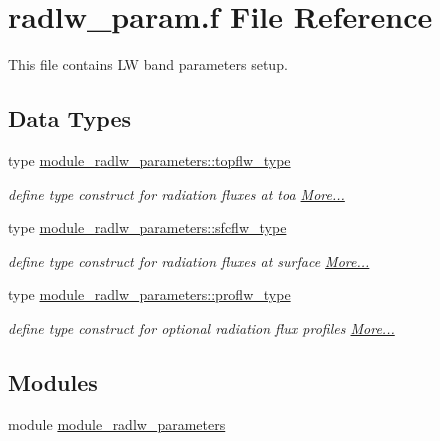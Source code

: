 \hypertarget{radlw__param_8f}{}\section{radlw\+\_\+param.\+f File Reference}
\label{radlw__param_8f}


This file contains LW band parameters setup.  


\subsection*{Data Types}
\begin{DoxyCompactItemize}
\item 
type \hyperlink{namespacemodule__radlw__parameters_structmodule__radlw__parameters_1_1topflw__type}{module\+\_\+radlw\+\_\+parameters\+::topflw\+\_\+type}
\begin{DoxyCompactList}\small\item\em define type construct for radiation fluxes at toa  \hyperlink{namespacemodule__radlw__parameters_structmodule__radlw__parameters_1_1topflw__type}{More...}\end{DoxyCompactList}\item 
type \hyperlink{group__module__radlw__main_structmodule__radlw__parameters_1_1sfcflw__type}{module\+\_\+radlw\+\_\+parameters\+::sfcflw\+\_\+type}
\begin{DoxyCompactList}\small\item\em define type construct for radiation fluxes at surface  \hyperlink{group__module__radlw__main_structmodule__radlw__parameters_1_1sfcflw__type}{More...}\end{DoxyCompactList}\item 
type \hyperlink{group__module__radlw__main_structmodule__radlw__parameters_1_1proflw__type}{module\+\_\+radlw\+\_\+parameters\+::proflw\+\_\+type}
\begin{DoxyCompactList}\small\item\em define type construct for optional radiation flux profiles  \hyperlink{group__module__radlw__main_structmodule__radlw__parameters_1_1proflw__type}{More...}\end{DoxyCompactList}\end{DoxyCompactItemize}
\subsection*{Modules}
\begin{DoxyCompactItemize}
\item 
module \hyperlink{namespacemodule__radlw__parameters}{module\+\_\+radlw\+\_\+parameters}
\end{DoxyCompactItemize}
